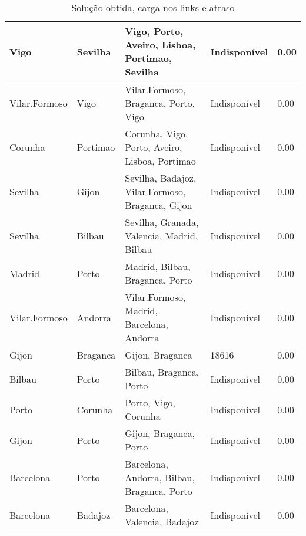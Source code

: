 \begin{table}[!htb]
{\begin{tabular}{|l|l|l|l|l|}
Vigo & Sevilha & Vigo, Porto, Aveiro, Lisboa, Portimao, Sevilha & Indisponível & 0.00 \\ \hline
Vilar.Formoso & Vigo & Vilar.Formoso, Braganca, Porto, Vigo & Indisponível & 0.00 \\ \hline
Corunha & Portimao & Corunha, Vigo, Porto, Aveiro, Lisboa, Portimao & Indisponível & 0.00 \\ \hline
Sevilha & Gijon & Sevilha, Badajoz, Vilar.Formoso, Braganca, Gijon & Indisponível & 0.00 \\ \hline
Sevilha & Bilbau & Sevilha, Granada, Valencia, Madrid, Bilbau & Indisponível & 0.00 \\ \hline
Madrid & Porto & Madrid, Bilbau, Braganca, Porto & Indisponível & 0.00 \\ \hline
Vilar.Formoso & Andorra & Vilar.Formoso, Madrid, Barcelona, Andorra & Indisponível & 0.00 \\ \hline
Gijon & Braganca & Gijon, Braganca & 18616 & 0.00 \\ \hline
Bilbau & Porto & Bilbau, Braganca, Porto & Indisponível & 0.00 \\ \hline
Porto & Corunha & Porto, Vigo, Corunha & Indisponível & 0.00 \\ \hline
Gijon & Porto & Gijon, Braganca, Porto & Indisponível & 0.00 \\ \hline
Barcelona & Porto & Barcelona, Andorra, Bilbau, Braganca, Porto & Indisponível & 0.00 \\ \hline
Barcelona & Badajoz & Barcelona, Valencia, Badajoz & Indisponível & 0.00 \\ \hline
\end{tabular}}
\caption[]{Solução obtida, carga nos links e atraso}
\end{table}

